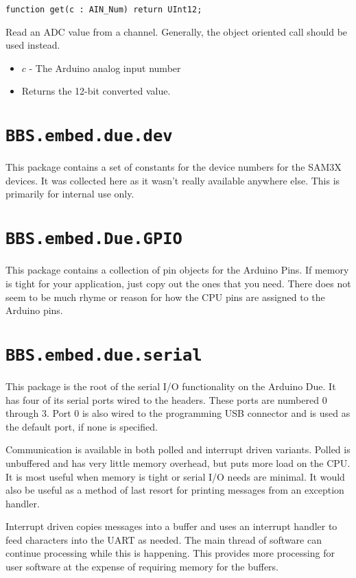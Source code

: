 \documentclass[10pt, openany]{book}
\newcommand{\indexfunc}[1]{\index[func]{#1}}
\newcommand{\package}[1]{\texttt{#1}}
\begin{document}
\begin{lstlisting}
function get(c : AIN_Num) return UInt12;
\end{lstlisting}
\indexfunc{get}
Read an ADC value from a channel.  Generally, the object oriented call should be used instead.
\begin{itemize}
  \item $c$ - The Arduino analog input number
  \item Returns the 12-bit converted value.
\end{itemize}

\section{\package{BBS.embed.due.dev}}
This package contains a set of constants for the device numbers for the SAM3X devices.  It was collected here as it wasn't really available anywhere else.  This is primarily for internal use only.

\section{\package{BBS.embed.Due.GPIO}}
This package contains a collection of pin objects for the Arduino Pins.  If memory is tight for your application, just copy out the ones that you need.  There does not seem to be much rhyme or reason for how the CPU pins are assigned to the Arduino pins.

\section{\package{BBS.embed.due.serial}}
This package is the root of the serial I/O functionality on the Arduino Due.  It has four of its serial ports wired to the headers.  These ports are numbered 0 through 3.  Port 0 is also wired to the programming USB connector and is used as the default port, if none is specified.

Communication is available in both polled and interrupt driven variants.  Polled is unbuffered and has very little memory overhead, but puts more load on the CPU.  It is most useful when memory is tight or serial I/O needs are minimal.  It would also be useful as a method of last resort for printing messages from an exception handler.

Interrupt driven copies messages into a buffer and uses an interrupt handler to feed characters into the UART as needed.  The main thread of software can continue processing while this is happening.  This provides more processing for user software at the expense of requiring memory for the buffers.
\end{document}
